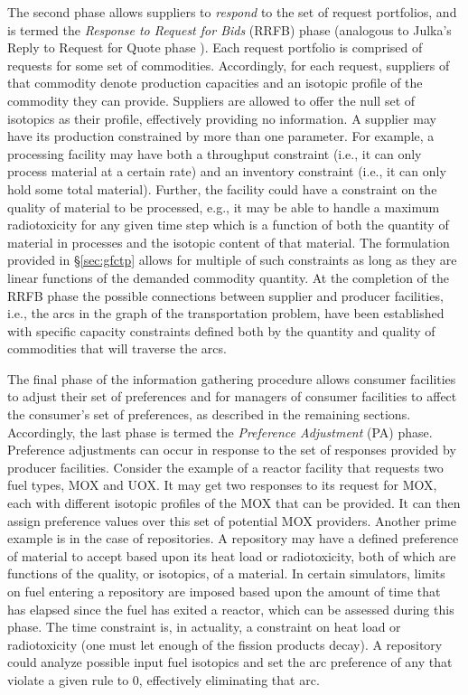 The second phase allows suppliers to \textit{respond} to the set of request
portfolios, and is termed the \textit{Response to Request for Bids} (RRFB) phase
(analogous to Julka's Reply to Request for Quote phase
\cite{julka_agent-based_2002}). Each request portfolio is comprised of
requests for some set of commodities. Accordingly, for each request, suppliers
of that commodity denote production capacities and an isotopic profile of the
commodity they can provide. Suppliers are allowed to offer the null set of
isotopics as their profile, effectively providing no information. A supplier may
have its production constrained by more than one parameter. For example, a
processing facility may have both a throughput constraint (i.e., it can only
process material at a certain rate) and an inventory constraint (i.e., it can
only hold some total material). Further, the facility could have a constraint on
the quality of material to be processed, e.g., it may be able to handle a
maximum radiotoxicity for any given time step which is a function of both the
quantity of material in processes and the isotopic content of that material. The
formulation provided in \S\ref{sec:gfctp} allows for multiple of such
constraints as long as they are linear functions of the demanded commodity
quantity. At the completion of the RRFB phase the possible connections between
supplier and producer facilities, i.e., the arcs in the graph of the
transportation problem, have been established with specific capacity constraints
defined both by the quantity and quality of commodities that will traverse the
arcs.

The final phase of the information gathering procedure allows consumer
facilities to adjust their set of preferences and for managers of consumer
facilities to affect the consumer's set of preferences, as described in the
remaining sections. Accordingly, the last phase is termed the \textit{Preference
 Adjustment} (PA) phase. Preference adjustments can occur in response to the
set of responses provided by producer facilities. Consider the example of a
reactor facility that requests two fuel types, MOX and UOX. It may get two
responses to its request for MOX, each with different isotopic profiles of the
MOX that can be provided. It can then assign preference values over this set of
potential MOX providers. Another prime example is in the case of repositories. A
repository may have a defined preference of material to accept based upon its
heat load or radiotoxicity, both of which are functions of the quality, or
isotopics, of a material. In certain simulators, limits on fuel entering a
repository are imposed based upon the amount of time that has elapsed since the
fuel has exited a reactor, which can be assessed during this phase. The time
constraint is, in actuality, a constraint on heat load or radiotoxicity (one
must let enough of the fission products decay). A repository could analyze
possible input fuel isotopics and set the arc preference of any that violate a
given rule to 0, effectively eliminating that arc.

